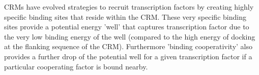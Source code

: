 CRMs have evolved strategies to recruit transcription factors by creating highly specific binding sites that reside within the CRM.  These very specific binding sites provide a potential energy 'well' that captures transcription factor due to the very low binding energy of the well (compared to the high energy of docking at the flanking sequence of the CRM).  Furthermore 'binding cooperativity' also provides a further drop of the potential well for a given transcription factor if a particular cooperating factor is bound nearby.  


